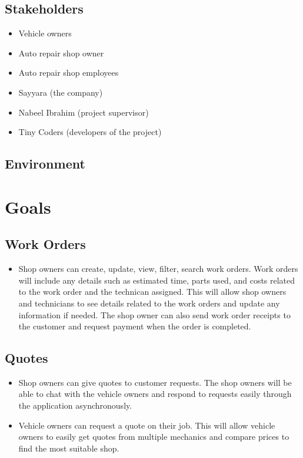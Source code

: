 \documentclass{article}
\begin{document}
\subsection{Stakeholders}
\begin{itemize}
    \item Vehicle owners
    \item Auto repair shop owner
    \item Auto repair shop employees
    \item Sayyara (the company)
    \item Nabeel Ibrahim (project supervisor)
    \item Tiny Coders (developers of the project)
\end{itemize}

\subsection{Environment}


\section{Goals}
\subsection{Work Orders}
\begin{itemize}
\item Shop owners can create, update, view, filter, search work orders. Work orders will include any details such as estimated time, parts used, and costs related to the work order and the technican assigned. This will allow shop owners and technicians to see details related to the work orders and update any information if needed. The shop owner can also send work order receipts to the customer and request payment when the order is completed.
\end{itemize}

\subsection{Quotes}
\begin{itemize}
\item Shop owners can give quotes to customer requests. The shop owners will be able to chat with the vehicle owners and respond to requests easily through the application asynchronously.
\item Vehicle owners can request a quote on their job. This will allow vehicle owners to easily get quotes from multiple mechanics and compare prices to find the most suitable shop.
\end{itemize}
\end{document}
